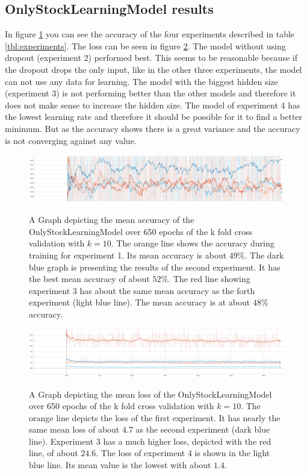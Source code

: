 \subsection{OnlyStockLearningModel results}
\label{subsec:onlystockmodelexperiment}
In figure \ref{fig:OSLM_k-accuracy} you can see the accuracy of the four experiments described in table \ref{tbl:experiments}. The loss can be seen in figure \ref{fig:OSLM_k-loss}. The model without using dropout (experiment 2) performed best. This seems to be reasonable because if the dropout drops the only input, like in the other three experiments, the model can not use any data for learning. The model with the biggest hidden size (experiment 3) is not performing better than the other models and therefore it does not make sense to increase the hidden size. The model of experiment 4 has the lowest learning rate and therefore it should be possible for it to find a better minimum. But as the accuracy shows there is a great variance and the accuracy is not converging against any value.\\
\begin{figure}[tb]
	\caption{A Graph depicting the mean accuracy of the OnlyStockLearningModel over 650 epochs of the k fold cross validation with $k=10$. The orange line shows the accuracy during training for experiment 1. Its mean accuracy is about $49\%$. The dark blue graph is presenting the results of the second experiment. It has the best mean accuracy of about $52\%$. The red line showing experiment 3 has about the same mean accuracy as the forth experiment (light blue line). The mean accuracy is at about $48\%$ accuracy.}
	\includegraphics[width=0.95\linewidth]{images/OSLM_k-accuracy.PNG}
	\label{fig:OSLM_k-accuracy}
\end{figure}
\begin{figure}[tb]
	\caption{A Graph depicting the mean loss of the OnlyStockLearningModel over 650 epochs of the k fold cross validation with $k=10$. The orange line depicts the loss of the first experiment. It has nearly the same mean loss of about $4.7$ as the second experiment (dark blue line). Experiment 3 has a much higher loss, depicted with the red line, of about $24.6$. The loss of experiment 4 is shown in the light blue line. Its mean value is the lowest with about $1.4$.}
	\includegraphics[width=0.95\linewidth]{images/OSLM_k-loss.PNG}
	\label{fig:OSLM_k-loss}
\end{figure}
